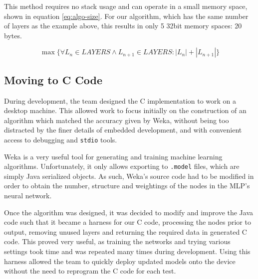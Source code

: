 This method requires no stack usage and can operate in a small memory space, shown in equation \ref{eq:algo-size}. For our algorithm, which has the same number of layers as the example above, this results in only 5 32bit memory spaces: 20 bytes.

\begin{equation}
\label{eq:algo-size}
\max\{\forall L_n \in LAYERS \wedge L_{n+1} \in LAYERS : |L_n|+|L_{n+1}|\}
\end{equation}

\subsection{Moving to C Code}

During development, the team designed the C implementation to work on a desktop machine. This allowed work to focus initially on the construction of an algorithm which matched the accuracy given by Weka, without being too distracted by the finer details of embedded development, and with convenient access to debugging and \verb|stdio| tools. 

Weka is a very useful tool for generating and training machine learning algorithms. Unfortunately, it only allows exporting to \verb|.model| files, which are simply Java serialized objects. As such, Weka's source code had to be modified in order to obtain the number, structure and weightings of the nodes in the MLP's neural network.

Once the algorithm was designed, it was decided to modify and improve the Java code such that it became a harness for our C code, processing the nodes prior to output, removing unused layers and returning the required data in generated C code. This proved very useful, as training the networks and trying various settings took time and was repeated many times during development. Using this harness allowed the team to quickly deploy updated models onto the device without the need to reprogram the C code for each test.